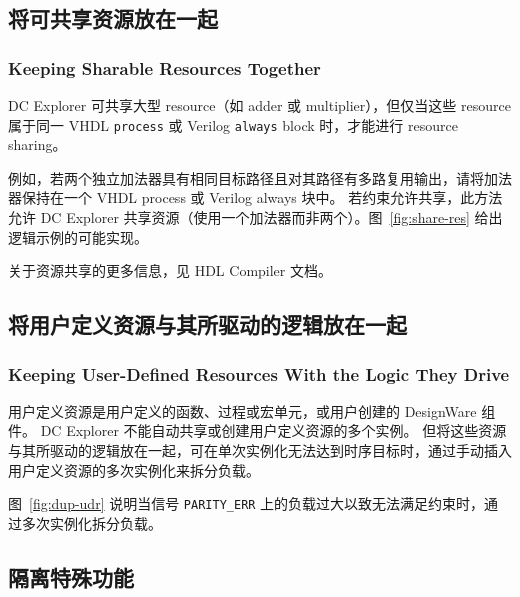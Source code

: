 \subsection{将可共享资源放在一起}
\subsubsection*{Keeping Sharable Resources Together}

DC Explorer 可共享大型 resource（如 adder 或 multiplier），但仅当这些 resource 属于同一 VHDL \texttt{process} 或 Verilog \texttt{always} block 时，才能进行 resource sharing。

例如，若两个独立加法器具有相同目标路径且对其路径有多路复用输出，请将加法器保持在一个 VHDL process 或 Verilog always 块中。
若约束允许共享，此方法允许 DC Explorer 共享资源（使用一个加法器而非两个）。图~\ref{fig:share-res} 给出逻辑示例的可能实现。


关于资源共享的更多信息，见 HDL Compiler 文档。

\subsection{将用户定义资源与其所驱动的逻辑放在一起}
\subsubsection*{Keeping User-Defined Resources With the Logic They Drive}

用户定义资源是用户定义的函数、过程或宏单元，或用户创建的 DesignWare 组件。
DC Explorer 不能自动共享或创建用户定义资源的多个实例。
但将这些资源与其所驱动的逻辑放在一起，可在单次实例化无法达到时序目标时，通过手动插入用户定义资源的多次实例化来拆分负载。

图~\ref{fig:dup-udr} 说明当信号 \texttt{PARITY\_ERR} 上的负载过大以致无法满足约束时，通过多次实例化拆分负载。


\subsection{隔离特殊功能}
